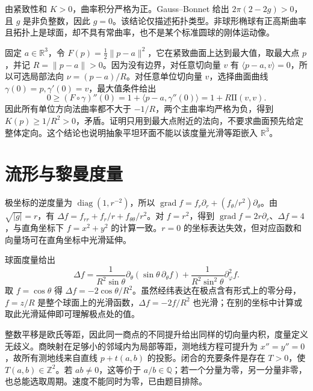 \documentclass[UTF8,12pt,a4paper,fontset=fandol]{ctexbook}
\newcommand{\R}{\mathbb R}
\newcommand{\ip}[2]{\langle #1,#2\rangle}
\newcommand{\norm}[1]{\lVert #1\rVert}
\DeclareMathOperator{\grad}{grad}
\begin{document}
\begin{solve}
由紧致性和 $K>0$，曲率积分严格为正。Gauss--Bonnet 给出 $2\pi(2-2g)>0$，且 $g$ 是非负整数，因此 $g=0$。该结论仅描述拓扑类型。非球形椭球有正高斯曲率且拓扑上是球面，却不具有常曲率，也不是某个标准圆球的刚体运动像。
\end{solve}

\begin{solve}
固定 $a\in\R^3$，令 $F(p)=\tfrac12\norm{p-a}^2$，它在紧致曲面上达到最大值，取最大点 $p$，并记 $R=\norm{p-a}>0$。因为没有边界，对任意切向量 $v$ 有 $\ip{p-a}v=0$，所以可选局部法向 $\nu=(p-a)/R$。对任意单位切向量 $v$，选择曲面曲线 $\gamma(0)=p,\gamma'(0)=v$，最大值条件给出
\[
 0\ge(F\circ\gamma)''(0)=1+\ip{p-a}{\gamma''(0)}
 =1+R\mathrm{II}(v,v).
\]
因此所有单位方向法曲率都不大于 $-1/R$，两个主曲率均严格为负，得到 $K(p)\ge1/R^2>0$，矛盾。证明只用到最大点附近的法向，不要求曲面预先给定整体定向。这个结论也说明抽象平坦环面不能以该度量光滑等距嵌入 $\R^3$。
\end{solve}

\section{流形与黎曼度量}
\begin{solve}
极坐标的逆度量为 $\operatorname{diag}(1,r^{-2})$，所以 $\grad f=f_r\partial_r+(f_\theta/r^2)\partial_\theta$。由 $\sqrt{|g|}=r$，有 $\Delta f=f_{rr}+f_r/r+f_{\theta\theta}/r^2$。对 $f=r^2$，得到 $\grad f=2r\partial_r$、$\Delta f=4$，与直角坐标下 $f=x^2+y^2$ 的计算一致。$r=0$ 的坐标表达失效，但对应函数和向量场可在直角坐标中光滑延伸。
\end{solve}

\begin{solve}
球面度量给出
\[
 \Delta f=\frac1{R^2\sin\theta}\partial_\theta(\sin\theta\,\partial_\theta f)
 +\frac1{R^2\sin^2\theta}\partial_\varphi^2f.
\]
取 $f=\cos\theta$ 得 $\Delta f=-2\cos\theta/R^2$。虽然经纬表达在极点含有形式上的零分母，$f=z/R$ 是整个球面上的光滑函数，$\Delta f=-2f/R^2$ 也光滑；在别的坐标中计算或取此光滑延伸即可理解极点处的值。
\end{solve}

\begin{solve}
整数平移是欧氏等距，因此同一商点的不同提升给出同样的切向量内积，度量定义无歧义。商映射在足够小的邻域内为局部等距，测地线方程可提升为 $x''=y''=0$，故所有测地线来自直线 $p+t(a,b)$ 的投影。闭合的充要条件是存在 $T>0$，使 $T(a,b)\in\mathbb Z^2$。若 $ab\ne0$，这等价于 $a/b\in\mathbb Q$；若一个分量为零，另一分量非零，也总能选取周期。速度不能同时为零，已由题目排除。
\end{solve}
\end{document}
